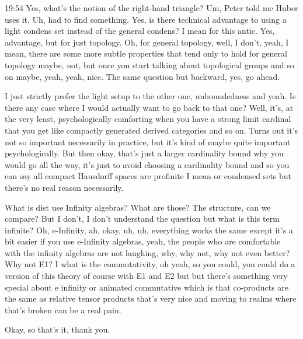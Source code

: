 \begin{unfinished}{19:54}
Yes, what's the notion of the right-hand triangle? Um, Peter told me Huber uses it. Uh, had to find something. Yes, is there technical advantage to using a light condens set instead of the general condens? I mean for this antic. Yes, advantage, but for just topology. Oh, for general topology, well, I don't, yeah, I mean, there are some more subtle properties that tend only to hold for general topology maybe, not, but once you start talking about topological groups and so on maybe, yeah, yeah, nice. The same question but backward, yes, go ahead.

I just strictly prefer the light setup to the other one, unboundedness and yeah. Is there any case where I would actually want to go back to that one? Well, it's, at the very least, psychologically comforting when you have a strong limit cardinal that you get like compactly generated derived categories and so on. Turns out it's not so important necessarily in practice, but it's kind of maybe quite important psychologically. But then okay, that's just a larger cardinality bound why you would go all the way, it's just to avoid choosing a cardinality bound and so you can say all compact Hausdorff spaces are profinite I mean or condensed sets but there's no real reason necessarily.

What is dist use Infinity algebras? What are those? The structure, can we compare? But I don't, I don't understand the question but what is this term infinite? Oh, e-Infinity, ah, okay, uh, uh, everything works the same except it's a bit easier if you use e-Infinity algebras, yeah, the people who are comfortable with the infinity algebras are not laughing, why, why not, why not even better? Why not E1? I what is the commutativity, oh yeah, so you could, you could do a version of this theory of course with E1 and E2 but but there's something very special about e infinity or animated commutative which is that co-products are the same as relative tensor products that's very nice and moving to realms where that's broken can be a real pain.

Okay, so that's it, thank you.
\end{unfinished}